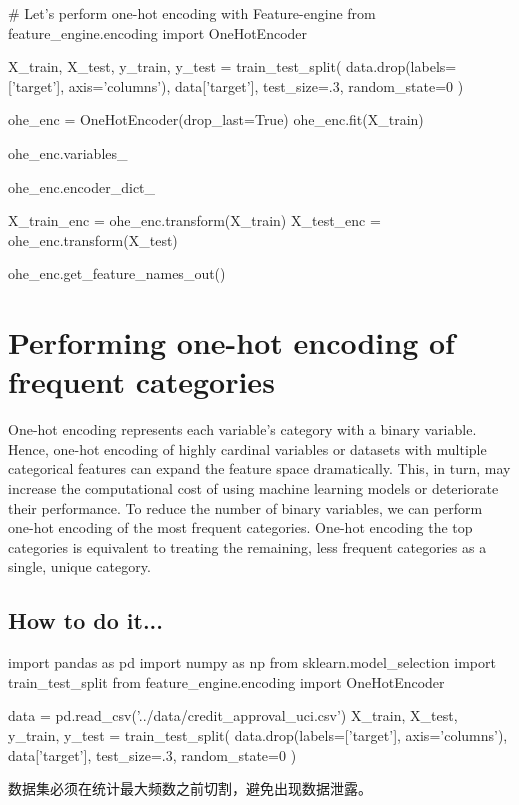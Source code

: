 \begin{pyc}
# Let's perform one-hot encoding with Feature-engine
from feature_engine.encoding import OneHotEncoder

X_train, X_test, y_train, y_test = train_test_split(
    data.drop(labels=['target'], axis='columns'), data['target'],
    test_size=.3,
    random_state=0
)

ohe_enc = OneHotEncoder(drop_last=True)
ohe_enc.fit(X_train)

ohe_enc.variables_

ohe_enc.encoder_dict_

X_train_enc = ohe_enc.transform(X_train)
X_test_enc = ohe_enc.transform(X_test)

ohe_enc.get_feature_names_out()
\end{pyc}

\section{Performing one-hot encoding of frequent categories}
One-hot encoding represents each variable’s category with a binary variable. Hence, one-hot encoding of highly cardinal variables or datasets with multiple categorical features can expand the feature space dramatically. This, in turn, may increase the computational cost of using machine learning models or deteriorate their performance. To reduce the number of binary variables, we can perform one-hot encoding of the most frequent categories. One-hot encoding the top categories is equivalent to treating the remaining, less frequent categories as a single, unique category.

\subsection{How to do it...}
\begin{pyc}
import pandas as pd
import numpy as np
from sklearn.model_selection import train_test_split
from feature_engine.encoding import OneHotEncoder
\end{pyc}

\begin{pyc}
data = pd.read_csv('../data/credit_approval_uci.csv')
X_train, X_test, y_train, y_test = train_test_split(
    data.drop(labels=['target'], axis='columns'), data['target'],
    test_size=.3,
    random_state=0
)
\end{pyc}

数据集必须在统计最大频数之前切割，避免出现数据泄露。

